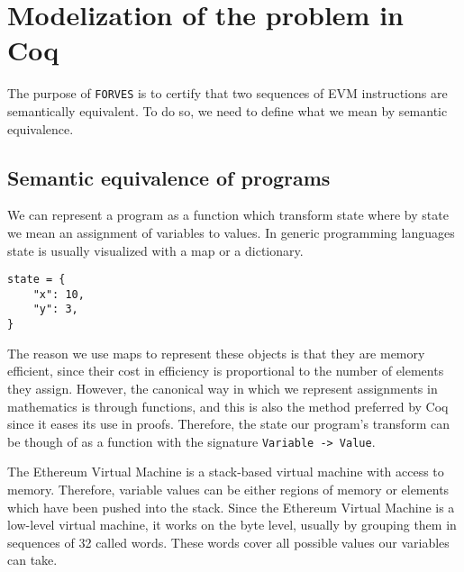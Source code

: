 \chapter{Modelization of the problem in Coq}
\label{cap:definitions}



The purpose of \texttt{FORVES} is to certify that two sequences of EVM instructions are 
semantically equivalent. To do so, we need to define what we mean by semantic equivalence.


\section{Semantic equivalence of programs}

We can represent a program as a function which transform state where by state we mean an assignment of 
variables to values. In generic programming languages state is usually visualized with a map or a
dictionary.

\begin{verbatim}
state = {
    "x": 10,
    "y": 3,
}
\end{verbatim}

The reason we use maps to represent these objects is that they are memory efficient, since their 
cost in efficiency is proportional to the number of elements they assign. However, the canonical 
way in which we represent assignments in mathematics is through functions, and this is also the 
method preferred by Coq since it eases its use in proofs. Therefore, the state our program's 
transform can be though of as a function with the signature \texttt{Variable -> Value}.

The Ethereum Virtual Machine is a stack-based virtual machine with access to memory. Therefore,
variable values can be either regions of memory or elements which have been pushed into the stack. 
Since the Ethereum Virtual Machine is a low-level virtual machine, it works on the byte level, usually
by grouping them in sequences of 32 called words. These words cover all possible values our variables 
can take.

